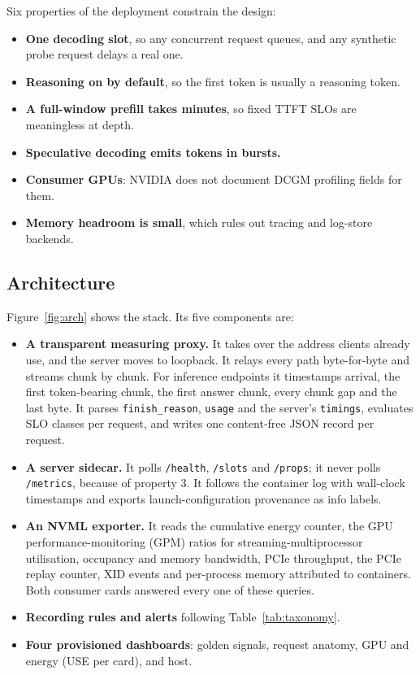 \documentclass[11pt]{article}
\begin{document}
Six properties of the deployment constrain the design:
\begin{itemize}
\item \textbf{One decoding slot}, so any concurrent request queues, and any synthetic probe request
delays a real one.
\item \textbf{Reasoning on by default}, so the first token is usually a reasoning token.
\item \textbf{A full-window prefill takes minutes}, so fixed TTFT SLOs are meaningless at depth.
\item \textbf{Speculative decoding emits tokens in bursts.}
\item \textbf{Consumer GPUs}: NVIDIA does not document DCGM profiling fields for them.
\item \textbf{Memory headroom is small}, which rules out tracing and log-store backends.
\end{itemize}

\subsection{Architecture}

Figure~\ref{fig:arch} shows the stack. Its five components are:
\begin{itemize}
\item \textbf{A transparent measuring proxy.} It takes over the address clients already use, and the
server moves to loopback. It relays every path byte-for-byte and streams chunk by chunk. For
inference endpoints it timestamps arrival, the first token-bearing chunk, the first answer chunk,
every chunk gap and the last byte. It parses \texttt{finish\_reason}, \texttt{usage} and the server's
\texttt{timings}, evaluates SLO classes per request, and writes one content-free JSON record per
request.
\item \textbf{A server sidecar.} It polls \texttt{/health}, \texttt{/slots} and \texttt{/props}; it
never polls \texttt{/metrics}, because of property 3. It follows the container log with wall-clock
timestamps and exports launch-configuration provenance as info labels.
\item \textbf{An NVML exporter.} It reads the cumulative energy counter, the GPU performance-monitoring
(GPM) ratios for streaming-multiprocessor utilisation, occupancy and memory bandwidth, PCIe
throughput, the PCIe replay counter, XID events and per-process memory attributed to containers.
Both consumer cards answered every one of these queries.
\item \textbf{Recording rules and alerts} following Table~\ref{tab:taxonomy}.
\item \textbf{Four provisioned dashboards}: golden signals, request anatomy, GPU and energy (USE per
card), and host.
\end{itemize}
\end{document}
